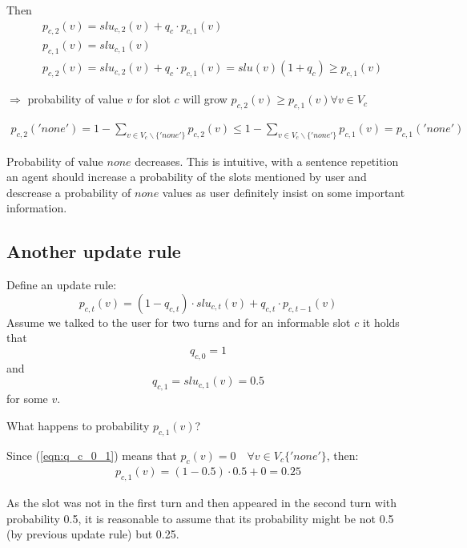 \documentclass[12pt,titlepage,a4paper]{article}
\begin{document}
\noindent Then
\begin{align*}
    &p_{c,2}(v) = slu_{c,2}(v) + q_c \cdot p_{c, 1}(v) 
    \\
    &p_{c,1}(v) = slu_{c,1}(v)
    \\
    &p_{c, 2}(v) = slu_{c,2}(v) + q_c \cdot p_{c, 1}(v) = slu(v)(1 + q_c) \geq p_{c,1}(v)
\end{align*}

\noindent $\Rightarrow$ probability of value $v$  for slot $c$ will grow $p_{c,2}(v) \geq p_{c,1}(v) \forall v \in V_c $

\begin{align*}
    p_{c,2}('none') = 1 - \sum_{v \in V_{c} \backslash \{'none'\}} p_{c,2}(v) \leq 1 - \sum_{v \in V_{c} \backslash \{'none'\}} p_{c,1}(v)  = p_{c,1}('none')
\end{align*}

\noindent Probability of value $none$ decreases.
This is intuitive, with a sentence repetition an agent should increase a probability of the slots mentioned by user and descrease a probability of $none$ values as user definitely insist on some important information.

\subsection{Another update rule}
Define an update rule:
\begin{equation}
    p_{c,t}(v) = (1-q_{c,t})\cdot slu_{c,t}(v) + q_{c,t} \cdot p_{c,t-1}(v)
\end{equation}
Assume we talked to the user for two turns and for an informable slot $c$ it holds that 
\begin{equation}
    \label{eqn:q_c_0_1}
    q_{c, 0} = 1
\end{equation}
and 
\begin{equation}
    \label{eqn:q_c_1}
    q_{c, 1} = slu_{c,1}(v) = 0.5
\end{equation}
for some $v$.

What happens to probability $p_{c,1}(v)$?

Since (\ref{eqn:q_c_0_1}) means that $p_c(v) = 0  \quad \forall v \in V_c\{'none'\} $, then: 
\begin{align*}
    p_{c,1}(v) = (1 - 0.5) \cdot 0.5 + 0 = 0.25
\end{align*}

As the slot was not in the first turn and then appeared in the second turn with probability 0.5, it is reasonable to assume that its probability might be not 0.5 (by previous update rule) but 0.25. 
\end{document}
